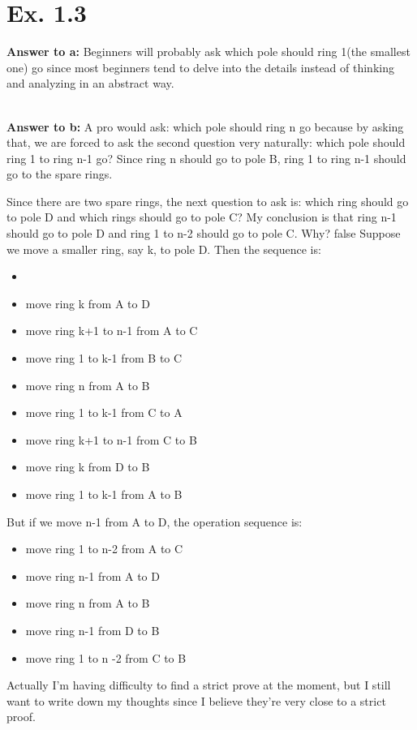 \documentclass[a4paper,11pt]{article}
\theoremstyle{mytheor}
\begin{document}
\section*{Ex. 1.3}

\textbf{Answer to a:} Beginners will probably ask which pole should ring 1(the smallest one) go since most beginners tend to delve into the details instead of thinking and analyzing in an abstract way.

~\\
\noindent\textbf{Answer to b:} A pro would ask: which pole should ring n go because by asking that, we are forced to ask the second question very naturally: which pole should ring 1 to ring n-1 go? Since ring n should go to pole B, ring 1 to ring n-1 should go to the spare rings.

Since there are two spare rings, the next question to ask is: which ring should go to pole D and which rings should go to pole C?
My conclusion is that ring n-1 should go to pole D and ring 1 to n-2 should go to pole C. 
Why?
\if false
Suppose we move a smaller ring, say k, to pole D.
Then the sequence is:
\begin{itemize}
    \item {\color{red}{ ring 1 to k-1 from A to B}}
    \item move ring k from A to D
    \item move ring k+1 to n-1 from A to C
    \item {\color{red}move ring 1 to k-1 from B to C}
    \item move ring n from A to B
    \item {\color{red}move ring 1 to k-1 from C to A}
    \item move ring k+1 to n-1 from C to B
    \item move ring k from D to B
    \item {\color{red}move ring 1 to k-1 from A to B}

\end{itemize}
But if we move n-1 from A to D, the operation sequence is:
\begin{itemize}
    \item move ring 1 to n-2 from A to C
    \item move ring n-1 from A to D
    \item move ring n from A to B
    \item move ring n-1 from D to B
    \item move ring 1 to n -2 from C to B
\end{itemize}
\fi
Actually I'm having difficulty to find a strict prove at the moment, but I still want to write down my thoughts since I believe they're very close to a strict proof.
\end{document}
